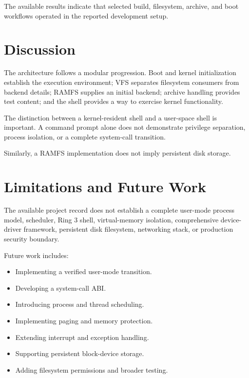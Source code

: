 \documentclass[conference]{IEEEtran}
\begin{document}
The available results indicate that selected build, filesystem,
archive, and boot workflows operated in the reported
development setup.

\section{Discussion}

The architecture follows a modular progression. Boot and
kernel initialization establish the execution environment;
VFS separates filesystem consumers from backend details;
RAMFS supplies an initial backend; archive handling provides
test content; and the shell provides a way to exercise
kernel functionality.

The distinction between a kernel-resident shell and a
user-space shell is important. A command prompt alone does
not demonstrate privilege separation, process isolation,
or a complete system-call transition.

Similarly, a RAMFS implementation does not imply persistent
disk storage.

\section{Limitations and Future Work}

The available project record does not establish a complete
user-mode process model, scheduler, Ring 3 shell,
virtual-memory isolation, comprehensive device-driver
framework, persistent disk filesystem, networking stack,
or production security boundary.

Future work includes:

\begin{itemize}
    \item Implementing a verified user-mode transition.
    \item Developing a system-call ABI.
    \item Introducing process and thread scheduling.
    \item Implementing paging and memory protection.
    \item Extending interrupt and exception handling.
    \item Supporting persistent block-device storage.
    \item Adding filesystem permissions and broader testing.
\end{itemize}
\end{document}
